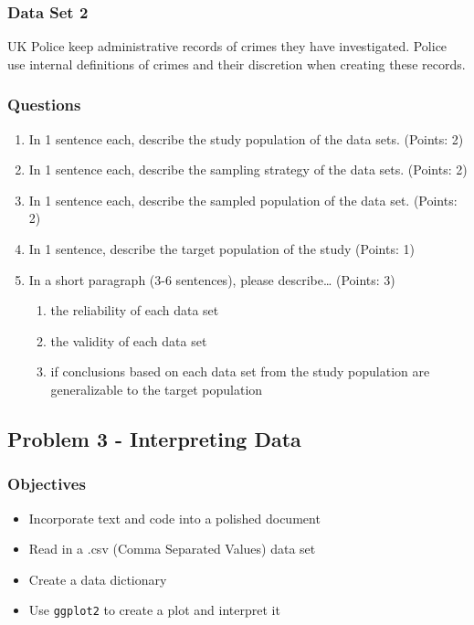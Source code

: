 \documentclass[
  letterpaper,
  DIV=11,
  numbers=noendperiod]{scrartcl}
\begin{document}
\subsubsection{Data Set 2}\label{data-set-2}

UK Police keep administrative records of crimes they have investigated.
Police use internal definitions of crimes and their discretion when
creating these records.

\subsubsection{Questions}\label{questions}

\begin{enumerate}
\def\labelenumi{\arabic{enumi}.}
\item
  In 1 sentence each, describe the study population of the data sets.
  (Points: 2)
\item
  In 1 sentence each, describe the sampling strategy of the data sets.
  (Points: 2)
\item
  In 1 sentence each, describe the sampled population of the data set.
  (Points: 2)
\item
  In 1 sentence, describe the target population of the study (Points: 1)
\item
  In a short paragraph (3-6 sentences), please describe\ldots{} (Points:
  3)

  \begin{enumerate}
  \def\labelenumii{\alph{enumii}.}
  \item
    the reliability of each data set
  \item
    the validity of each data set
  \item
    if conclusions based on each data set from the study population are
    generalizable to the target population
  \end{enumerate}
\end{enumerate}

\subsection{Problem 3 - Interpreting
Data}\label{problem-3---interpreting-data}

\subsubsection{Objectives}\label{objectives-2}

\begin{itemize}
\item
  Incorporate text and code into a polished document
\item
  Read in a .csv (Comma Separated Values) data set
\item
  Create a data dictionary
\item
  Use \texttt{ggplot2} to create a plot and interpret it
\end{itemize}
\end{document}
